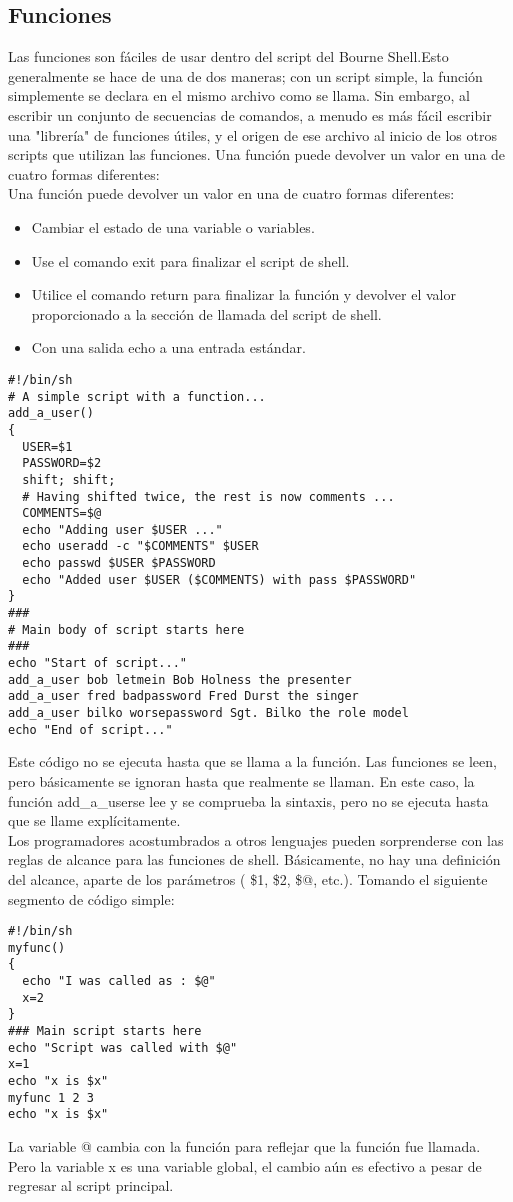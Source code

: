 \documentclass{article}
\begin{document}
\begin{itemize}
\subsection*{Funciones}
Las funciones son fáciles de usar dentro del script del Bourne Shell.Esto generalmente se hace de una de dos maneras; con un script simple, la función simplemente se declara en el mismo archivo como se llama. Sin embargo, al escribir un conjunto de secuencias de comandos, a menudo es más fácil escribir una "librería" de funciones útiles, y el origen de ese archivo al inicio de los otros scripts que utilizan las funciones. Una función puede devolver un valor en una de cuatro formas diferentes:\\
Una función puede devolver un valor en una de cuatro formas diferentes:
\begin{itemize}
\item Cambiar el estado de una variable o variables.
\item Use el comando exit para finalizar el script de shell.
\item Utilice el comando return para finalizar la función y devolver el valor proporcionado a la sección de llamada del script de shell.
\item Con una salida echo a una entrada estándar.
\end{itemize}
\begin{verbatim}
#!/bin/sh
# A simple script with a function...
add_a_user()
{
  USER=$1
  PASSWORD=$2
  shift; shift;
  # Having shifted twice, the rest is now comments ...
  COMMENTS=$@
  echo "Adding user $USER ..."
  echo useradd -c "$COMMENTS" $USER
  echo passwd $USER $PASSWORD
  echo "Added user $USER ($COMMENTS) with pass $PASSWORD"
}
###
# Main body of script starts here
###
echo "Start of script..."
add_a_user bob letmein Bob Holness the presenter
add_a_user fred badpassword Fred Durst the singer
add_a_user bilko worsepassword Sgt. Bilko the role model
echo "End of script..."
\end{verbatim}
Este código no se ejecuta hasta que se llama a la función. Las funciones se leen, pero básicamente se ignoran hasta que realmente se llaman. En este caso, la función add\_a\_userse lee y se comprueba la sintaxis, pero no se ejecuta hasta que se llame explícitamente.\\
Los programadores acostumbrados a otros lenguajes pueden sorprenderse con las reglas de alcance para las funciones de shell. Básicamente, no hay una definición del alcance, aparte de los parámetros ( \$1, \$2, \$@, etc.). Tomando el siguiente segmento de código simple:
\begin{verbatim}
#!/bin/sh
myfunc()
{
  echo "I was called as : $@"
  x=2
}
### Main script starts here
echo "Script was called with $@"
x=1
echo "x is $x"
myfunc 1 2 3
echo "x is $x"
\end{verbatim}
La variable @ cambia con la función para reflejar que la función fue llamada. Pero la
variable x es una variable global, el cambio aún es efectivo a pesar de regresar al script principal.

\end{itemize}
\end{document}
